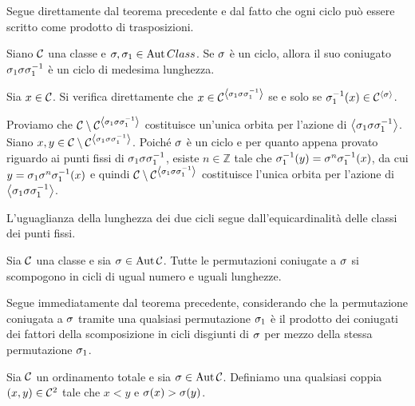 \Proof
Segue direttamente dal teorema precedente e dal fatto
che ogni ciclo pu\`o essere scritto come prodotto di
trasposizioni.
\EndProof
\begin{Theorem}
	Siano $\mathcal{C}$ una classe e
	$\Permutation, \Permutation_1 \in \Automorphisms{Class}$.
	Se $\Permutation$ \`e un ciclo, allora il suo coniugato
	$\Permutation_1\Permutation\Permutation_1^{-1}$ \`e un ciclo
	di medesima lunghezza.
\end{Theorem}
\Proof
Sia $x \in \mathcal{C}$.
Si verifica direttamente che
$x \in \Fixed{\Class}{\SpanGroup{\Permutation_1\Permutation\Permutation_1^{-1}}}$
se e solo se
$\Permutation_1^{-1}(x) \in \Fixed{\Class}{\SpanGroup{\Permutation}}$.
\par
Proviamo che
$\Class \SetMin
\Fixed{\Class}{\SpanGroup{\Permutation_1\Permutation\Permutation_1^{-1}}}$ costituisce
un'unica orbita per l'azione di
$\SpanGroup{\Permutation_1\Permutation\Permutation_1^{-1}}$.
Siano $x, y \in
\Class \SetMin
\Fixed{\Class}{\SpanGroup{\Permutation_1\Permutation\Permutation_1^{-1}}}$.
Poich\'e $\Permutation$ \`e un ciclo e per quanto appena provato riguardo ai punti fissi
di $\Permutation_1\Permutation\Permutation_1^{-1}$, esiste $n \in \mathbb{Z}$ tale che
$\Permutation_1^{-1}(y) = \Permutation^n\Permutation_1^{-1}(x)$, da cui
$y = \Permutation_1\Permutation^n\Permutation_1^{-1}(x)$ e quindi
$\Class \SetMin
\Fixed{\Class}{\SpanGroup{\Permutation_1\Permutation\Permutation_1^{-1}}}$ costituisce
l'unica orbita per l'azione di
$\SpanGroup{\Permutation_1\Permutation\Permutation_1^{-1}}$.
\par
L'uguaglianza della lunghezza dei due cicli segue dall'equicardinalit\`a
delle classi dei punti fissi.
\EndProof
\begin{Corollary}
	Sia $\mathcal{C}$ una classe e sia
	$\Permutation \in \Automorphisms{\Class}$.
	Tutte le permutazioni coniugate a $\Permutation$
	si scompogono in cicli di ugual numero e uguali lunghezze.
\end{Corollary}
\Proof
Segue immediatamente dal teorema precedente,
considerando che la permutazione coniugata a $\Permutation$ tramite
una qualsiasi permutazione $\Permutation_1$ \`e il prodotto dei
coniugati dei fattori della scomposizione in cicli disgiunti di $\Permutation$
per mezzo della stessa permutazione $\Permutation_1$.
\EndProof
\begin{Definition}
	Sia $\mathcal{C}$ un ordinamento totale
	e sia $\Permutation \in \Automorphisms{\Class}$.
	Definiamo  una qualsiasi coppia
	$(x,y) \in \mathcal{C}^2$ tale che
	$x < y$ e $\Permutation(x) > \Permutation(y)$.
\end{Definition}
